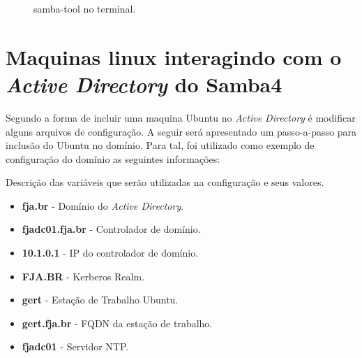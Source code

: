\begin{figure}[h!]
   	\centering
   	\caption{samba-tool no terminal.}
    \label{samba-tool}
\end{figure}

\section{Maquinas linux interagindo com o \textit{Active Directory} do  Samba4}

Segundo \cite{UBUNTU-WIKI} a forma de incluir uma maquina Ubuntu no \textit{Active Directory} é modificar alguns arquivos de configuração. A seguir será apresentado um passo-a-passo para inclusão do Ubuntu no domínio. Para tal, foi utilizado como exemplo de configuração do domínio as seguintes informações:

Descrição das variáveis que serão utilizadas na configuração e seus valores.

\begin{itemize}
	\item \textbf{fja.br} -  Domínio do \textit{Active Directory}.
	\item \textbf{fjadc01.fja.br} - Controlador de domínio.
	\item \textbf{10.1.0.1} - IP do controlador de domínio.
	\item \textbf{FJA.BR} - Kerberos Realm.
	\item \textbf{gert} - Estação de Trabalho Ubuntu.
	\item \textbf{gert.fja.br} - FQDN da estação de trabalho.
	\item \textbf{fjadc01} - Servidor NTP.
\end{itemize}

